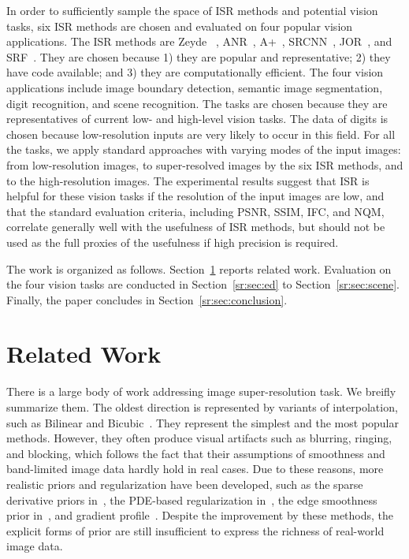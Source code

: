 In order to sufficiently sample the space of ISR methods and potential
vision tasks, six ISR methods are chosen and evaluated on four popular
vision applications. The ISR methods are Zeyde
\etal~\citep{Zeyde-CS-2012}, ANR~\citep{Timofte-ICCV-2013},
A+~\citep{Timofte-ACCV-2014}, SRCNN~\citep{Dong-ECCV-2014}, 
JOR~\citep{JOR:EG15}, and SRF~\citep{SR_forest}.
They are chosen because 1) they are popular and representative; 
2) they have code available; and 3) they are computationally efficient.  
The four vision applications include image boundary detection, semantic image segmentation, 
digit recognition, and scene recognition. The tasks are chosen because they are representatives of
current low- and high-level vision tasks. The data of digits is chosen because low-resolution 
inputs are very likely to occur in this field. For all the tasks, we apply 
standard approaches with varying modes of the input images: from
low-resolution images, to super-resolved images by
the six ISR methods, and to the high-resolution images. The experimental
results suggest that ISR is helpful for these vision
tasks if the resolution of the input images are low, and that the
standard evaluation criteria, including PSNR, SSIM, IFC, and NQM, correlate generally well with
the usefulness of ISR methods, but should not be used as the full proxies of the usefulness 
if high precision is required.

The work  is organized as follows. Section~\ref{sr:sec:relatedwork}
reports related work. Evaluation on the four vision tasks are
conducted in Section~\ref{sr:sec:ed} to Section~\ref{sr:sec:scene}. Finally,
the paper concludes in Section~\ref{sr:sec:conclusion}.

\section{Related Work}
\label{sr:sec:relatedwork}
There is a large body of work addressing image super-resolution
task. We breifly summarize them. %
The oldest direction is represented by variants of interpolation, such
as Bilinear and
Bicubic~\citep{Duchon-JAM-1979,Thevenaz-BOOK-2000}. They represent the
simplest and the most popular methods. However, they often produce
visual artifacts such as blurring, ringing, and blocking, which
follows the fact that their assumptions of smoothness and band-limited
image data hardly hold in real cases. Due to these reasons, more
realistic priors and regularization have been developed, such as the
sparse derivative priors in~\citep{Tappen-WSCTV-2003}, the PDE-based
regularization in~\citep{Tschumperle-PAMI-2005}, the edge
smoothness prior in~\citep{Dai-CVPR-2007}, and gradient profile~\citep{Sun-CVPR-2008}. Despite the improvement by
these methods, the explicit forms of prior are still insufficient to
express the richness of real-world image data.


